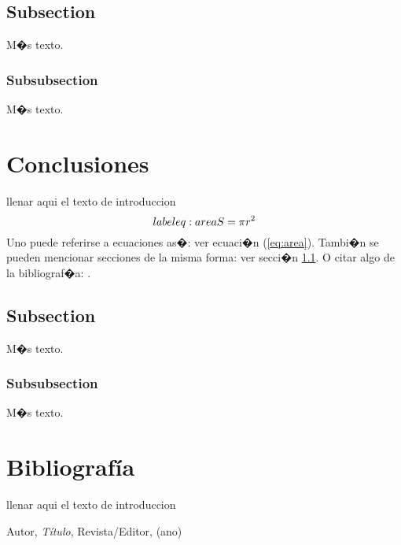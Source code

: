 \documentclass{article}
\theoremstyle{definition}
\theoremstyle{remark}
\begin{document}
\subsection{Subsection}\label{sec:nada}

M�s texto.

\subsubsection{Subsubsection}\label{sec:nada2}

M�s texto.






\section{Conclusiones}

llenar aqui el texto de introduccion
\begin{equation}\\label{eq:area}
  S = \pi r^2
\end{equation}
Uno puede referirse a ecuaciones as�: ver ecuaci�n (\ref{eq:area}).
Tambi�n se pueden mencionar secciones de la misma forma: ver secci�n
\ref{sec:nada}. O citar algo de la bibliograf�a: \cite{Cd94}.

\subsection{Subsection}\label{sec:nada}

M�s texto.

\subsubsection{Subsubsection}\label{sec:nada2}

M�s texto.





\section{Bibliograf\'ia}

llenar aqui el texto de introduccion








\begin{thebibliography}{99}

 Autor, \emph{T\'itulo}, Revista/Editor, (ano)

\end{thebibliography}
\end{document}
